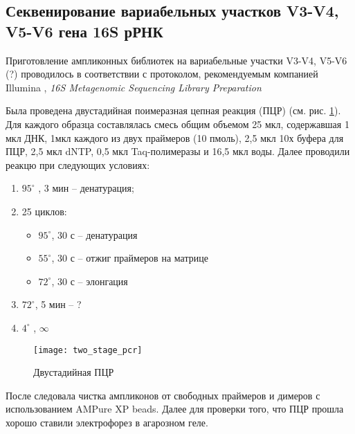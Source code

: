 \subsection{Секвенирование вариабельных участков V3-V4, V5-V6 гена 16S рРНК}  \label{subsect1_2_2}

Приготовление ампликонных библиотек на вариабельные участки V3-V4, V5-V6 (?) проводилось  в соответствии с протоколом, рекомендуемым компанией Illumina , \textit{16S Metagenomic Sequencing Library Preparation }

Была проведена  двустадийная поимеразная цепная реакция (ПЦР) (см. рис. \ref{img:two_stage_pcr}). Для каждого образца составлялась смесь общим объемом 25 мкл, содержавшая 1 мкл ДНК, 1мкл каждого из двух праймеров (10 пмоль), 2,5 мкл 10х буфера для ПЦР, 2,5 мкл dNTP, 0,5 мкл  Taq-полимеразы и 16,5 мкл воды. Далее проводили реакцю при следующих условиях:
\begin{enumerate}
	\item $95^{\circ}$ , 3 мин – денатурация;
	\item 25 циклов:
	\begin{itemize}
		\item $95^{\circ}$, 30 с – денатурация
		\item $55^{\circ}$, 30 с – отжиг праймеров на матрице
		\item $72^{\circ}$, 30 с – элонгация	
	\end{itemize}
	\item $72^{\circ}$, 5 мин – ?
	\item  $4^{\circ}$ ,  $\infty$ 
\end{enumerate}

\begin{figure}[h]
  \texttt{[image: two\_stage\_pcr]}
  \centering
  \caption{Двустадийная ПЦР}
  \label{img:two_stage_pcr}  
\end{figure}

После следовала чистка ампликонов от свободных праймеров и димеров с использованием AMPure XP beads. Далее для проверки того, что ПЦР прошла хорошо ставили электрофорез в агарозном геле. 

